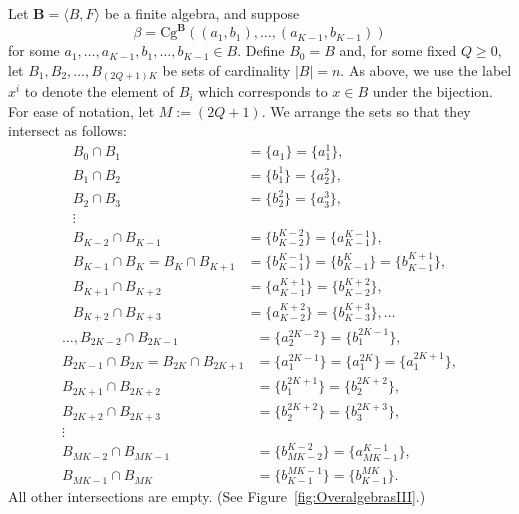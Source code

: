 \documentclass[cm,dissertation]{uhthesis}
\theoremstyle{plain}
\theoremstyle{definition}
\theoremstyle{remark}
\numberwithin{theorem}{section}
\numberwithin{claim}{chapter}
\numberwithin{equation}{section}
\numberwithin{conjecture}{chapter}
\newcommand{\<}{\ensuremath{\langle}}
\renewcommand{\>}{\ensuremath{\rangle}}
\renewcommand{\geq}{\ensuremath{\geqslant}}
\newcommand{\Cg}{\ensuremath{\mathrm{Cg}}}
\newcommand{\supi}{\ensuremath{^{i}}}
\newcommand{\0}{\ensuremath{\mathbf{0}}}
\newcommand{\1}{\ensuremath{\mathbf{1}}}
\newcommand{\2}{\ensuremath{\mathbf{2}}}
\newcommand{\3}{\ensuremath{\mathbf{3}}}
\newcommand{\4}{\ensuremath{\mathbf{4}}}
\newcommand{\5}{\ensuremath{\mathbf{5}}}
\newcommand{\bB}{\ensuremath{\mathbf{B}}}
\begin{document}
Let $\bB = \<B, F\>$ be a finite algebra, and suppose 
\[
\beta = \Cg^{\bB}((a_1, b_1), \dots, (a_{K-1},b_{K-1}))
\]
for some $a_1, \dots, a_{K-1}, b_1, \dots, b_{K-1} \in B$.
Define $B_0=B$ and, for some fixed $Q\geq 0$, let $B_1, B_2, \dots, B_{(2Q+1)K}$ be sets of
cardinality $|B| = n$.  As above, we use the label $x^i$ to denote the element of $B_i$ which
corresponds to $x\in B$ under the bijection.  
For ease of notation, let $M:=(2Q+1)$.  
We arrange the sets so that they intersect as follows:
\begin{align*}
  B_0\cap B_1 &=\{a_1\}=\{a_1^{1}\},\\
  B_1\cap B_2 &=\{b^1_1\}=\{a_2^{2}\},\\
  B_2\cap B_3 &=\{b^2_2\}=\{a_3^{3}\},\\
\vdots\\
B_{K-2}\cap B_{K-1} &= \{b_{K-2}^{K-2}\}=\{a_{K-1}^{K-1}\},\\
  B_{K-1}\cap B_K = B_K\cap B_{K+1}&=\{b^{K-1}_{K-1}\}=\{b^{K}_{K-1}\}=\{b^{K+1}_{K-1}\},\\
  B_{K+1}\cap B_{K+2}&=\{a^{K+1}_{K-1}\} =\{b^{K+2}_{K-2}\},\\
  B_{K+2}\cap B_{K+3}&=\{a^{K+2}_{K-2}\} =\{b^{K+3}_{K-3}\}, \dots
\end{align*}
\begin{align*}
\dots,  B_{2K-2}\cap B_{2K-1} &= \{a_{2}^{2K-2}\}=\{b_{1}^{2K-1}\},\\
  B_{2K-1}\cap B_{2K} = B_{2K}\cap  B_{2K+1}&=\{a^{2K-1}_{1}\}=\{a^{2K}_{1}\}=\{a^{2K+1}_{1}\},\\
  B_{2K+1}\cap B_{2K+2}&=\{b^{2K+1}_{1}\} =\{b^{2K+2}_{2}\},\\
  B_{2K+2}\cap B_{2K+3}&=\{b^{2K+2}_{2}\} =\{b^{2K+3}_{3}\},\\
  \vdots\\
  B_{MK-2}\cap B_{MK-1} &= \{b_{MK-2}^{K-2}\}=\{a_{MK-1}^{K-1}\},\\
  B_{MK-1}\cap B_{MK}&=\{b^{MK-1}_{K-1}\}=\{b^{MK}_{K-1}\}.
\end{align*}
All other intersections are empty. (See Figure~\ref{fig:OveralgebrasIII}.)
\end{document}
